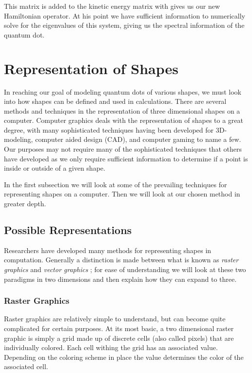 \documentclass[authoryearcitations]{UoYCSproject}
\begin{document}
This matrix is added to the kinetic energy matrix with gives us our new Hamiltonian operator. At his point
we have sufficient information to numerically solve for the eigenvalues of this system, giving us the spectral information
of the quantum dot.  
 



\section{Representation of Shapes}
In reaching our goal of modeling quantum dots of various shapes, we must look into how shapes can be defined and used in 
calculations. There are several methods and techniques in the representation of three dimensional shapes on a computer. 
Computer graphics deals with the representation of shapes to a great degree, with many sophisticated techniques having been 
developed for 3D-modeling, computer aided design (CAD), and computer gaming to name a few. Our purposes may not require
many of the sophisticated techniques that others have developed as we only require sufficient information to determine if
a point is inside or outside of a given shape. 

In the first subsection we will look at some of the prevailing techniques for representing shapes on a computer. Then we will 
look at our chosen method in greater depth. 

\subsection{Possible Representations}
Researchers have developed many methods for representing shapes in computation. Generally a distinction is made between what is 
known as \emph{raster graphics} and \emph{vector graphics} \cite{bors}; for ease of understanding we will look at these two 
paradigms in two dimensions and then explain how they can expand to three. 

\subsubsection{Raster Graphics}
Raster graphics are relatively simple to understand, but can become quite complicated for certain purposes. At its most basic, 
a two dimensional raster graphic is simply a grid made up of discrete cells (also called pixels) that are individually colored.  
Each cell withing the grid has an associated value. Depending on the coloring scheme in place the value determines the 
color of the associated cell. 
\end{document}
